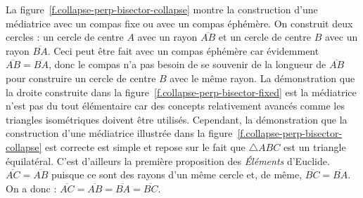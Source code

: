 \begin{minipage}{0.4\textwidth}
\centering   
{}
         \label{f.collapse-perp-bisector-fixed}
     \end{minipage}
     \hspace{3em}
     \begin{minipage}{0.4\textwidth}
\centering   
{}
         \label{f.collapse-perp-bisector-collapse}
     \end{minipage}

\vspace{0.4cm}


La figure~\ref{f.collapse-perp-bisector-collapse} montre la construction d'une médiatrice  avec un compas fixe ou avec un compas éphémère. On construit deux cercles : un cercle de centre $A$ avec un rayon  $\overline{AB}$ et un cercle de centre $B$ avec un rayon  $\overline{BA}$. Ceci peut être fait avec un compas éphémère car  évidemment  $\overline{AB}=\overline{BA}$, donc le compas n'a pas besoin de \og se souvenir\fg{} de la longueur de $\overline{AB}$ pour construire un cercle de centre $B$ avec le même rayon.
La démonstration que la droite construite  dans la figure~\ref{f.collapse-perp-bisector-fixed} est la médiatrice  n'est pas du tout élémentaire car des concepts relativement avancés comme les triangles isométriques doivent être utilisés. Cependant, la démonstration  que la construction d'une médiatrice  illustrée dans la figure~\ref{f.collapse-perp-bisector-collapse} est correcte est simple et repose sur le fait que $\triangle ABC$  est un triangle équilatéral. C'est d'ailleurs la première proposition des \emph{Éléments} d'Euclide. 
$\overline{AC}=\overline{AB}$ puisque ce sont des rayons d'un même cercle et, de même, $\overline{BC}=\overline{BA}$. On a donc : $
\overline{AC}=\overline{AB}=\overline{BA}=\overline{BC}$.

